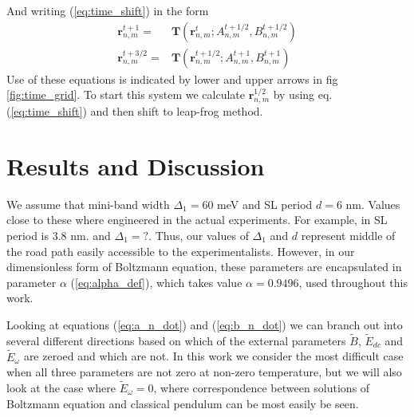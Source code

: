 \documentclass[40pt,letterpaper,physrev]{article}
\begin{document}
	\begin{minipage}{\linewidth}
	\label{fig:time_grid}
	\end{minipage}
	And writing (\ref{eq:time_shift}) in the form
	\begin{align}
		\mathbf{r}^{t+1}_{n,m}=&\mathbf{T}(\mathbf{r}^t_{n,m};A^{t+1/2}_{n,m},B^{t+1/2}_{n,m}) \label{eq:leap_frog_shift_1} \\
		\mathbf{r}^{t+3/2}_{n,m}=&\mathbf{T}(\mathbf{r}^{t+1/2}_{n,m};A^{t+1}_{n,m},B^{t+1}_{n,m}) \label{eq:leap_frog_shift_2}
	\end{align}
	Use of these equations is indicated by lower and upper arrows in fig \ref{fig:time_grid}. To start this system we calculate $\mathbf{r}^{1/2}_{n,m}$ by using eq. (\ref{eq:time_shift}) and then shift to leap-frog method.
    \section{Results and Discussion}
    We assume that mini-band width $\Delta_1=60$ meV and SL period $d=6$ nm. Values close to these where engineered
    in the actual experiments. For example, in \cite{PhysRevB.56.10303} SL period is $3.8$ nm. and $\Delta_1=?$. 
    Thus, our values of $\Delta_1$ and $d$ represent middle of the road path easily accessible to the
    experimentalists. However, in our dimensionless form of Boltzmann equation, these parameters are encapsulated
    in parameter $\alpha$ (\ref{eq:alpha_def}), which takes value $\alpha=0.9496$, used throughout this work. 
    
    Looking at equations (\ref{eq:a_n_dot}) and (\ref{eq:b_n_dot}) we can branch out into several different 
    directions based on which of the external parameters $\tilde{B}$, $\tilde{E}_{dc}$ and $\tilde{E}_\omega$ 
    are zeroed and which are not. In this work we consider the most difficult case when all three parameters
    are not zero at non-zero temperature, but we will also look at the case where $\tilde{E}_\omega=0$, where
    correspondence between solutions of Boltzmann equation and classical pendulum can be most easily be seen.
    
\end{document}
